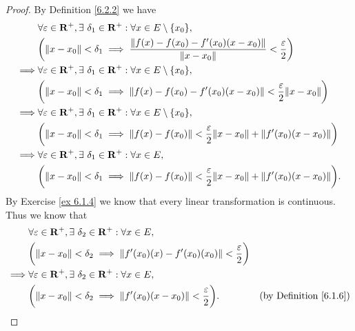 \begin{proof}
    By Definition \ref{6.2.2} we have
    \begin{align*}
                 & \forall \varepsilon \in \R^+, \exists\ \delta_1 \in \R^+ : \forall x \in E \setminus \{x_0\},                                             \\
                 & \bigg(\norm*{x - x_0} < \delta_1 \implies \frac{\norm*{f(x) - f(x_0) - f'(x_0)(x - x_0)}}{\norm*{x - x_0}} < \frac{\varepsilon}{2}\bigg)  \\
        \implies & \forall \varepsilon \in \R^+, \exists\ \delta_1 \in \R^+ : \forall x \in E \setminus \{x_0\},                                             \\
                 & \bigg(\norm*{x - x_0} < \delta_1 \implies \norm*{f(x) - f(x_0) - f'(x_0)(x - x_0)} < \frac{\varepsilon}{2} \norm*{x - x_0}\bigg)          \\
        \implies & \forall \varepsilon \in \R^+, \exists\ \delta_1 \in \R^+ : \forall x \in E \setminus \{x_0\},                                             \\
                 & \bigg(\norm*{x - x_0} < \delta_1 \implies \norm*{f(x) - f(x_0)} < \frac{\varepsilon}{2} \norm*{x - x_0} + \norm*{f'(x_0)(x - x_0)}\bigg)  \\
        \implies & \forall \varepsilon \in \R^+, \exists\ \delta_1 \in \R^+ : \forall x \in E,                                                               \\
                 & \bigg(\norm*{x - x_0} < \delta_1 \implies \norm*{f(x) - f(x_0)} < \frac{\varepsilon}{2} \norm*{x - x_0} + \norm*{f'(x_0)(x - x_0)}\bigg).
    \end{align*}
    By Exercise \ref{ex 6.1.4} we know that every linear transformation is continuous.
    Thus we know that
    \begin{align*}
                 & \forall \varepsilon \in \R^+, \exists\ \delta_2 \in \R^+ : \forall x \in E,                                                                    \\
                 & \bigg(\norm*{x - x_0} < \delta_2 \implies \norm*{f'(x_0)(x) - f'(x_0)(x_0)} < \frac{\varepsilon}{2}\bigg)                                      \\
        \implies & \forall \varepsilon \in \R^+, \exists\ \delta_2 \in \R^+ : \forall x \in E,                                                                    \\
                 & \bigg(\norm*{x - x_0} < \delta_2 \implies \norm*{f'(x_0)(x - x_0)} < \frac{\varepsilon}{2}\bigg).         & \text{(by Definition \ref{6.1.6})}

\end{align*}
\end{proof}
